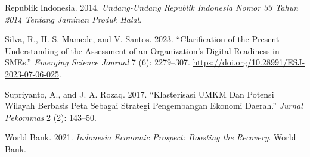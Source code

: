 \documentclass[
  default,
]{sn-jnl}
\newlength{\cslhangindent}
\newenvironment{CSLReferences}[2] %
 {\begin{list}{}{%
  \setlength{\itemindent}{0pt}
  \setlength{\leftmargin}{0pt}
  \setlength{\parsep}{0pt}
  \ifodd #1
   \setlength{\leftmargin}{\cslhangindent}
   \setlength{\itemindent}{-1\cslhangindent}
  \fi
  \setlength{\itemsep}{#2\baselineskip}}}
 {\end{list}}
\begin{document}
\begin{CSLReferences}{1}{1}
Republik Indonesia. 2014. \emph{Undang-Undang Republik Indonesia Nomor
33 Tahun 2014 Tentang Jaminan Produk Halal}.

Silva, R., H. S. Mamede, and V. Santos. 2023. {``Clarification of the
Present Understanding of the Assessment of an Organization's Digital
Readiness in SMEs.''} \emph{Emerging Science Journal} 7 (6): 2279--307.
\url{https://doi.org/10.28991/ESJ-2023-07-06-025}.

Supriyanto, A., and J. A. Rozaq. 2017. {``Klasterisasi UMKM Dan Potensi
Wilayah Berbasis Peta Sebagai Strategi Pengembangan Ekonomi Daerah.''}
\emph{Jurnal Pekommas} 2 (2): 143--50.

World Bank. 2021. \emph{Indonesia Economic Prospect: Boosting the
Recovery}. World Bank.

\end{CSLReferences}
\end{document}
